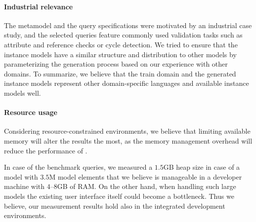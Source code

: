 \paragraph{Industrial relevance}
The metamodel and the query specifications were motivated by an industrial case
study, and the selected queries feature commonly used validation tasks such as
attribute and reference checks or cycle detection. We tried to ensure that the
instance models have a similar structure and distribution to other models by
parameterizing the generation process based on our experience with other
domains. To summarize, we believe that the train domain and the generated
instance models represent other domain-specific languages and available instance
models well.

\paragraph{Resource usage}
Considering resource-constrained environments, we believe that limiting
available memory will alter the results the most, as the memory management
overhead will reduce the performance of \eiq{}.

In case of the benchmark queries, we measured a $1.5$GB heap size in case of a
model with $3.5$M model elements that we believe is manageable in a developer
machine with $4$--$8$GB of RAM. On the other hand, when handling such large
models the existing user interface itself could become a bottleneck. Thus we
believe, our measurement results hold also in the integrated development
environments.
